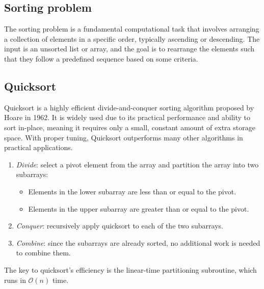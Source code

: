 \subsection{Sorting problem}

The sorting problem is a fundamental computational task that involves arranging a collection of elements in a specific order, typically ascending or descending. 
The input is an unsorted list or array, and the goal is to rearrange the elements such that they follow a predefined sequence based on some criteria.

\subsection{Quicksort}
Quicksort is a highly efficient divide-and-conquer sorting algorithm proposed by Hoare in 1962. 
It is widely used due to its practical performance and ability to sort in-place, meaning it requires only a small, constant amount of extra storage space. 
With proper tuning, Quicksort outperforms many other algorithms in practical applications.
\begin{enumerate}
    \item \textit{Divide}: select a pivot element from the array and partition the array into two subarrays:
        \begin{itemize}
            \item Elements in the lower subarray are less than or equal to the pivot.
            \item Elements in the upper subarray are greater than or equal to the pivot.
        \end{itemize}
    \item \textit{Conquer}: recursively apply quicksort to each of the two subarrays.
    \item \textit{Combine}: since the subarrays are already sorted, no additional work is needed to combine them.
\end{enumerate}
The key to quicksort's efficiency is the linear-time partitioning subroutine, which runs in $\mathcal{O}(n)$ time. 


